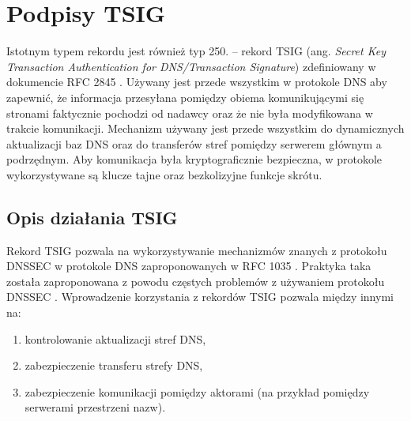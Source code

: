 \section{Podpisy TSIG}
\label{TSIG}
\noindent Istotnym typem rekordu jest również typ 250. -- rekord TSIG (ang. \textit{Secret Key Transaction Authentication for DNS/Transaction
Signature}) zdefiniowany w dokumencie RFC 2845 \cite{RFC2845}. Używany jest przede wszystkim w protokole DNS aby zapewnić, że
informacja przesyłana pomiędzy obiema komunikującymi się stronami faktycznie pochodzi od nadawcy oraz że nie była modyfikowana w
trakcie komunikacji. Mechanizm używany jest przede wszystkim do dynamicznych aktualizacji baz DNS oraz do transferów stref pomiędzy
serwerem głównym a podrzędnym. Aby komunikacja była kryptograficznie bezpieczna, w protokole wykorzystywane są klucze tajne oraz
bezkolizyjne funkcje skrótu.

\subsection{Opis działania TSIG}
\label{tsig}
\noindent Rekord TSIG pozwala na wykorzystywanie mechanizmów znanych z protokołu DNSSEC \cite{nask-tsig} w protokole DNS zaproponowanych w
RFC 1035 \cite{RFC1035}. Praktyka taka została zaproponowana z powodu częstych problemów z używaniem protokołu
DNSSEC \cite{RFC4033, RFC4035}. Wprowadzenie korzystania z rekordów TSIG pozwala między innymi na:
\begin{enumerate}
	\item kontrolowanie aktualizacji stref DNS,
	\item zabezpieczenie transferu strefy DNS,
	\item zabezpieczenie komunikacji pomiędzy aktorami (na przykład pomiędzy serwerami przestrzeni nazw).
\end{enumerate}

